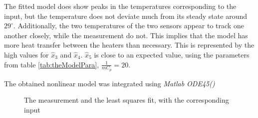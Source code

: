 The fitted model does show peaks in the temperatures corresponding to the input, but the temperature does not deviate much from its steady state around $29^{\circ}$. Additionally, the two temperatures of the two sensors appear to track one another closely, while the measurement do not. This implies that the model has more heat transfer between the heaters than necessary. This is represented by the high values for $\hat{x}_3$ and $\hat{x}_4$. $\hat{x}_5$ is close to an expected value, using the parameters from table \ref{tab:theModelPara}, $\frac{1}{mC_p} = 20$.

The obtained nonlinear model was integrated using \textit{Matlab ODE45()} 
\begin{figure}
    \centering
    
    \caption{The measurement and the least squares fit, with the corresponding input}
    \label{fig:lsqfit}
\end{figure}